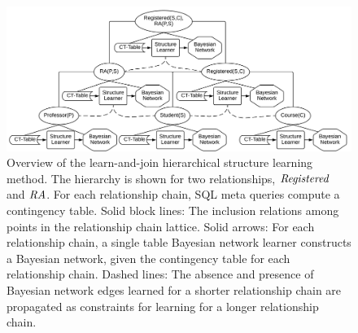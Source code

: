 \begin{figure}[htbp] %
 \centering
 \includegraphics[width=1\textwidth]{laj.png} 
\caption{Overview of the learn-and-join hierarchical structure learning method. The hierarchy is shown for 
two relationships, $\it{Registered}$ and $\it{RA}$. For each relationship chain, SQL meta queries compute a contingency table. Solid block lines: The inclusion relations among points in the relationship chain lattice. Solid arrows: For each relationship chain, a single table Bayesian network learner constructs a Bayesian network, given the contingency table for each relationship chain. Dashed lines: The absence and presence of Bayesian network edges learned for a shorter relationship chain are propagated as constraints for learning for a longer relationship chain.}
 \label{fig:lattice}
\end{figure}



